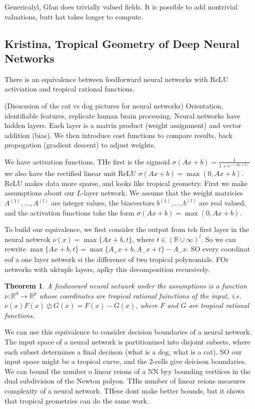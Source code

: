\documentclass[11pt]{article}
\theoremstyle{definition}
\theoremstyle{plain}%
\newtheorem{prototheorem}{Theorem}[section]
\newenvironment{theorem}
   {\colorlet{shadecolor}{orange!15}\begin{shaded} \begin{prototheorem}}
   {\end{prototheorem}\end{shaded}}
\theoremstyle{definition}
\def\RR{{\mathbb R}}
\begin{document}
Genericalyl, Gfan does trivially valued fields. It is possible to add nontrivial valuations, butt hat takes longer to compute.


\subsection{Kristina, Tropical Geometry of Deep Neural Networks}

There is an equivalence between feedforward neural networks with ReLU activiation and tropical rational functions.

(Disucssion of the cat vs dog pictures for neural networks) Orientation, identifiable features, replicate human brain processing. Neural networks have hidden layers. Each layer is a matrix product (weight assignment) and vector addition (bias). We then introduce cost functions to compare results, back propogation (gradient descent) to adjust weights.

We have activation functions. THe first is the sigmoid $\sigma(Ax+b)= \frac{1}{1+e^{-(Ax+b)}}$ we also have the rectified linear unit ReLU $\sigma(Ax+b)= \max(0,Ax+b)$. ReLU makes data more sparse, and looks like tropical geometry. First we make assumptions about our $L$-layer network. We assume that the weight matricies $A^(1), \dots, A^{(l)}$ are integer values, the biasvectors $b^{(1)}, \dots, b^{(l)}$ are real valued, and the activation functions take the form  $\sigma(Ax+b)= \max(0,Ax+b)$.


To build our equivalence, we first consider the output from teh first layer in the neural netwrok $\nu(x) = \max\{Ax+b,t\}$, where $t \in (\RR\cup \infty)^l$. So we can rewrite $\max\{Ax+b,t\} = \max\{A_+x+b, A_-x + t\} - A_-x$. SO every coordinat eof a one layer network si the difference of two tropical polynomials. FOr networks with uktuple layers, aplky this decomposition recursively.

\begin{theorem}
    A feedworard neural network under the assumptions is a function $\nu: \RR^d \rightarrow \RR^p$ whose coordinates are tropical rational fuinctions of the input, i.e. $\nu(x) F(x) \oslash G(x) = F(x) -G(x)$, where $F$ and $G$ are tropical rational functions.
\end{theorem}


We can use this equivalence to consider decision boundaries of a neural network. The input space of a neural network is partitionined into disjoint subsets, where each subset determines a final deciison (what is a dog, what is a cat). SO our input space might be a tropical curve, and the 2-cells give deicison boundaries. We can bound the number o linear reions of a NN byy bounding vertiices in the dual subdivision of the Newton polyon. THis number of linear reions measures complexity of a neural network. THese dont make better bounds, but it shows that tropical geometries can do the same work.
\end{document}
